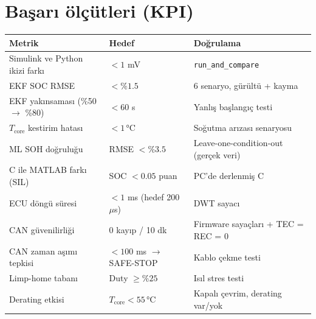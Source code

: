 \documentclass[11pt,a4paper]{article}
\begin{document}
\section{Başarı ölçütleri (KPI)}
\begin{center}
\renewcommand{\arraystretch}{1.2}
\begin{tabularx}{\textwidth}{X l l}
\toprule
Metrik & Hedef & Doğrulama \\
\midrule
Simulink ve Python ikizi farkı & $<1$ mV & \texttt{run\_and\_compare} \\
EKF SOC RMSE & $<\%1.5$ & 6 senaryo, gürültü + kayma \\
EKF yakınsaması (\%50 $\rightarrow$ \%80) & $<60$ s & Yanlış başlangıç testi \\
$T_\text{core}$ kestirim hatası & $<1$\,°C & Soğutma arızası senaryosu \\
ML SOH doğruluğu & RMSE $<\%3.5$ & Leave-one-condition-out (gerçek veri) \\
C ile MATLAB farkı (SIL) & SOC $<0.05$ puan & PC'de derlenmiş C \\
ECU döngü süresi & $<1$ ms (hedef 200\,$\mu$s) & DWT sayacı \\
CAN güvenilirliği & 0 kayıp / 10 dk & Firmware sayaçları + TEC = REC = 0 \\
CAN zaman aşımı tepkisi & $<100$ ms $\rightarrow$ SAFE-STOP & Kablo çekme testi \\
Limp-home tabanı & Duty $\ge\%25$ & Isıl stres testi \\
Derating etkisi & $T_\text{core}<55$\,°C & Kapalı çevrim, derating var/yok \\
\bottomrule
\end{tabularx}
\end{center}

\end{document}
